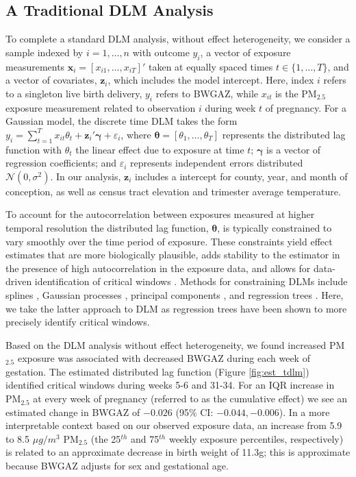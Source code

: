\documentclass[12pt]{article}
\begin{document}
\subsection{A Traditional DLM Analysis}\label{sec:tdlm_analysis}
To complete a standard DLM analysis, without effect heterogeneity, we consider a sample indexed by $i=1,\ldots,n$ with outcome $y_i$, a vector of exposure measurements $\mathbf{x}_i=[x_{i1},\ldots,x_{iT}]'$ taken at equally spaced times $t\in\{1,\ldots,T\}$, and a vector of covariates, $\mathbf{z}_i$, which includes the model intercept. Here, index $i$ refers to a singleton live birth delivery, $y_i$ refers to BWGAZ, while $x_{it}$ is the PM$_{2.5}$ exposure measurement related to observation $i$ during week $t$ of pregnancy. For a Gaussian model, the discrete time DLM takes the form $y_i=\sum_{t=1}^T x_{it}\theta_t+\mathbf{z}_i'\boldsymbol\gamma+\varepsilon_i$, where $\boldsymbol\theta=[\theta_1,\ldots,\theta_T]$ represents the distributed lag function with $\theta_t$ the linear effect due to exposure at time $t$; $\boldsymbol\gamma$ is a vector of regression coefficients; and $\varepsilon_i$ represents independent errors distributed $\mathcal{N}(0,\sigma^2)$. In our analysis, $\mathbf{z}_i$ includes a intercept for county, year, and month of conception, as well as census tract elevation and trimester average temperature. %

To account for the autocorrelation between exposures measured at higher temporal resolution the distributed lag function, $\boldsymbol\theta$, is typically constrained to vary smoothly over the time period of exposure. These constraints yield effect estimates that are more biologically plausible, adds stability to the estimator in the presence of high autocorrelation in the exposure data, and allows for data-driven identification of critical windows \citep{Wilson2017PotentialHealth}. Methods for constraining DLMs include splines \citep{Zanobetti2000}, Gaussian processes \citep{Warren2020}, principal components \citep{Wilson2017a}, and regression trees \citep{Mork2023EstimatingPairs}. Here, we take the latter approach to DLM as regression trees have been shown to more precisely identify critical windows. %

Based on the DLM analysis without effect heterogeneity, we found increased PM$_{2.5}$ exposure was associated with decreased BWGAZ during each week of gestation. The estimated distributed lag function (Figure \ref{fig:est_tdlm}) identified critical windows during weeks 5-6 and 31-34. For an IQR increase in PM$_{2.5}$ at every week of pregnancy (referred to as the cumulative effect) we see an estimated change in BWGAZ of $-0.026$ (95\% CI: $-0.044,-0.006$). In a more interpretable context based on our observed exposure data, an increase from 5.9 to 8.5 $\mu g/m^3$ PM$_{2.5}$ (the 25$^{th}$ and 75$^{th}$ weekly exposure percentiles, respectively) is related to an approximate decrease in birth weight of 11.3g; this is approximate because BWGAZ adjusts for sex and gestational age.
\end{document}
